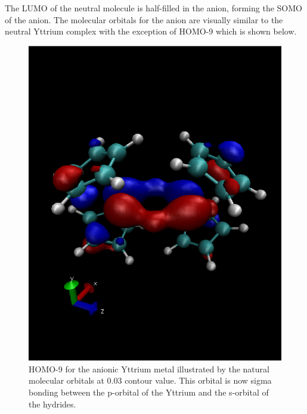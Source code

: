 \documentclass[11pt]{article}
\newcommand*{\comment}[1]{{\color{blue} #1}}
\begin{document}
%
%
%

The LUMO of the neutral molecule is half-filled in the anion,
forming the SOMO of the anion. The molecular orbitals for the
anion are visually similar to the neutral Yttrium complex with
the exception of HOMO-9 which is shown below.

\begin{figure}[H]
  \centering
  \includegraphics[scale=0.4]{73n.eps}
  \caption{HOMO-9 for the anionic Yttrium metal illustrated by the natural
    molecular orbitals at 0.03 contour value. This orbital is
now sigma bonding between the p-orbital of the Yttrium and the
s-orbital of the hydrides.}
\end{figure}
\end{document}
